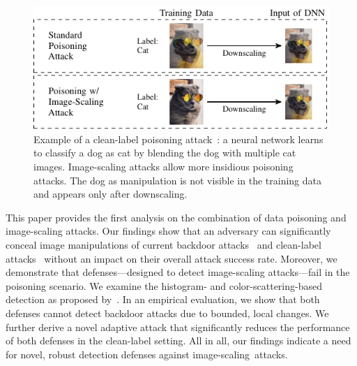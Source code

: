 \documentclass[conference]{IEEEtran}
\begin{document}
\begin{figure}[t]
	\centering
	\includegraphics{./ext_images/scaler_poisoning-figure0.pdf}
	\vspace{-0.59cm}
	\caption{Example of a clean-label poisoning 
	attack~\citep{ShaHuaNaj+18}: a neural network 
	learns to classify a dog as cat by blending the dog with multiple 
	cat images. %
	Image-scaling attacks allow more insidious poisoning attacks.
	The dog as manipulation is not visible in the training data and 
	appears only after downscaling.
	}
	\label{fig:intro_example_poisoning}
\end{figure}

This paper provides the first analysis on the combination of data 
poisoning and image-scaling attacks. Our findings show that an 
adversary can significantly conceal image manipulations of current 
backdoor attacks~\citep{GuDolGar17} and clean-label 
attacks~\citep{ShaHuaNaj+18} without an impact on their overall attack 
success rate.
Moreover, we demonstrate that defenses---designed to detect 
image-scaling attacks---fail in the poisoning scenario.
We examine the histogram- and color-scattering-based detection as 
proposed by~\citet{XiaCheShe+19}. In an empirical evaluation, we show 
that both defenses cannot detect backdoor attacks due to bounded, 
local changes. We further derive a novel adaptive attack that 
significantly reduces the performance of both defenses in the 
clean-label setting.
All in all, our findings indicate a need for novel, robust detection 
defenses against image-scaling~attacks.
\end{document}
